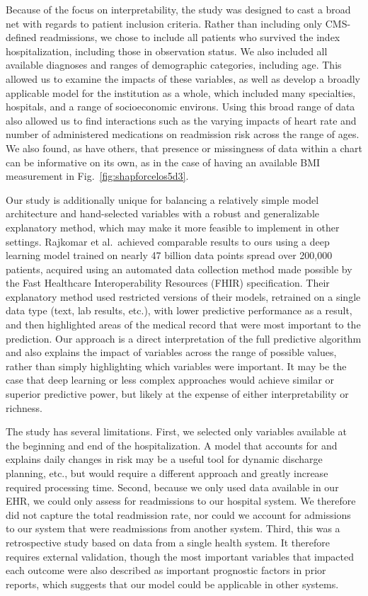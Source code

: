 Because of the focus on interpretability, 
the study was designed to cast a broad net with regards to patient inclusion criteria. 
Rather than including only CMS-defined readmissions, 
we chose to include all patients who survived the index hospitalization, 
including those in observation status. 
We also included all available diagnoses and ranges of demographic categories, including age. 
This allowed us to examine the impacts of these variables, 
as well as develop a broadly applicable model for the institution as a whole, 
which included many specialties, hospitals, and a range of socioeconomic environs. 
Using this broad range of data also allowed us to find interactions such as 
the varying impacts of heart rate and number of administered medications 
on readmission risk across the range of ages. 
We also found, as have others,\supercite{Agniel2018}
that presence or missingness of data within a chart can be informative on its own, 
as in the case of having an available BMI measurement in Fig.\ \ref{fig:shapforcelos5d3}.

Our study is additionally unique for balancing a relatively simple model architecture 
and hand-selected variables with a robust and generalizable explanatory method, 
which may make it more feasible to implement in other settings. 
Rajkomar et al.\ achieved comparable results to ours using a deep learning model 
trained on nearly 47 billion data points spread over 200,000 patients, 
acquired using an automated data collection method made possible by 
the Fast Healthcare Interoperability Resources (FHIR) specification.\supercite{Rajkomar2018}\@
Their explanatory method used restricted versions of their models, 
retrained on a single data type (text, lab results, etc.), 
with lower predictive performance as a result, 
and then highlighted areas of the medical record that were 
most important to the prediction.
Our approach is a direct interpretation of the full predictive algorithm 
and also explains the impact of variables across the range of possible values, 
rather than simply highlighting which variables were important. 
It may be the case that deep learning or less complex approaches would achieve 
similar or superior predictive power, 
but likely at the expense of either interpretability or richness.\supercite{Aubert2017,Garrison2017,sun2017unreasonable}

The study has several limitations. 
First, we selected only variables available at the beginning and end of the hospitalization. 
A model that accounts for and explains daily changes in risk 
may be a useful tool for dynamic discharge planning, etc., 
but would require a different approach and greatly increase required processing time. 
Second, because we only used data available in our EHR, 
we could only assess for readmissions to our hospital system. 
We therefore did not capture the total readmission rate, 
nor could we account for admissions to our system that were readmissions from another system. 
Third, this was a retrospective study based on data from a single health system. 
It therefore requires external validation, though the most important variables 
that impacted each outcome were also described as important prognostic factors in prior reports, 
which suggests that our model could be applicable in other systems. 

